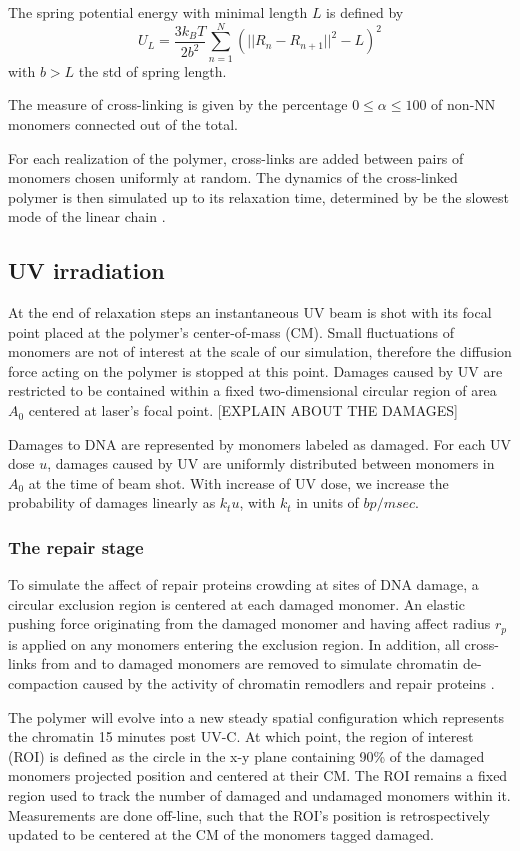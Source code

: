 \documentclass[12pt]{article}
\begin{document}
	The spring potential energy with minimal length $L$ is defined by  
	\begin{equation}
	U_L=\frac{3k_BT}{2b^2}\sum_{n=1}^N (||R_{n}-R_{n+1}||^2-L)^2
	\end{equation}
    with $b>L$ the std of spring length. 
    	
	The measure of cross-linking is given by the percentage $0\leq \alpha\leq 100$ of non-NN monomers connected out of the total.
	
	 For each realization of the polymer, cross-links are added between pairs of monomers chosen uniformly at random. The dynamics of the cross-linked polymer is then simulated up to its relaxation time, determined by be the slowest mode of the linear chain \cite{doi1988theory}.

	\subsection{UV irradiation}
	At the end of relaxation steps an instantaneous UV beam is shot with its focal point placed at the polymer's center-of-mass (CM). Small fluctuations of monomers are not of interest at the scale of our simulation, therefore the diffusion force acting on the polymer is stopped at this point. Damages caused by UV are restricted to be contained within a fixed two-dimensional circular region of area $A_0$ centered at laser's focal point. [EXPLAIN ABOUT THE DAMAGES]
	
	Damages to DNA are represented by monomers labeled as damaged. For each UV dose $u$, damages caused by UV are uniformly distributed between  monomers in $A_0$ at the time of beam shot. With increase of UV dose, we increase the probability of damages linearly as $k_tu$, with $k_t$ in units of $bp/msec$. 
	
	\subsubsection{The repair stage}	
	To simulate the affect of repair proteins crowding at sites of DNA damage, a circular exclusion region is centered at each damaged monomer. An elastic pushing force originating from the damaged monomer and having affect radius $r_p$ is applied on any monomers entering the exclusion region. In addition, all cross-links from and to damaged monomers are removed to simulate chromatin de-compaction caused by the activity of chromatin remodlers and repair proteins \cite{gaillard2003chromatin}. 
	
	The polymer will evolve into a new steady spatial configuration which represents the chromatin 15 minutes post UV-C. At which point, the region of interest (ROI) is defined as the circle in the x-y plane containing 90\% of the damaged monomers projected position and centered at their CM. The ROI remains a fixed region used to track the number of damaged and undamaged monomers within it. Measurements are done off-line, such that the ROI's position is retrospectively updated to be centered at the CM of the monomers tagged damaged.
	
\end{document}
